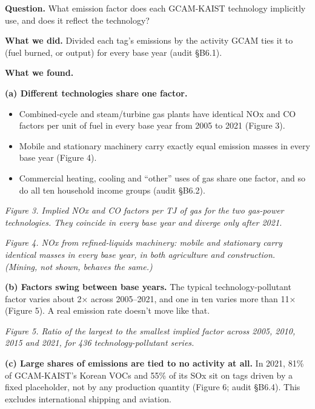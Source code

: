 \textbf{Question.}
What
emission
factor
does each
GCAM-KAIST
technology
implicitly
use, and
does it
reflect
the
technology?

\textbf{What
we did.}
Divided
each tag's
emissions
by the
activity
GCAM ties
it to
(fuel
burned, or
output)
for every
base year
(audit
§B6.1).

\textbf{What
we found.}

\textbf{(a)
Different
technologies
share one
factor.}

\begin{itemize}
\tightlist
\item
  Combined-cycle
  and
  steam/turbine
  gas
  plants
  have
  identical
  NOx and
  CO
  factors
  per unit
  of fuel
  in every
  base
  year
  from
  2005 to
  2021
  (Figure
  3).
\item
  Mobile
  and
  stationary
  machinery
  carry
  exactly
  equal
  emission
  masses
  in every
  base
  year
  (Figure
  4).
\item
  Commercial
  heating,
  cooling
  and
  ``other''
  uses of
  gas
  share
  one
  factor,
  and so
  do all
  ten
  household
  income
  groups
  (audit
  §B6.2).
\end{itemize}


\emph{Figure
3. Implied
NOx and CO
factors
per TJ of
gas for
the two
gas-power
technologies.
They
coincide
in every
base year
and
diverge
only after
2021.}


\emph{Figure
4. NOx
from
refined-liquids
machinery:
mobile and
stationary
carry
identical
masses in
every base
year, in
both
agriculture
and
construction.
(Mining,
not shown,
behaves
the
same.)}

\textbf{(b)
Factors
swing
between
base
years.}
The
typical
technology-pollutant
factor
varies
about 2×
across
2005--2021,
and one in
ten varies
more than
11×
(Figure
5). A real
emission
rate
doesn't
move like
that.


\emph{Figure
5. Ratio
of the
largest to
the
smallest
implied
factor
across
2005,
2010, 2015
and 2021,
for 436
technology-pollutant
series.}

\textbf{(c)
Large
shares of
emissions
are tied
to no
activity
at all.}
In 2021,
81\% of
GCAM-KAIST's
Korean
VOCs and
55\% of
its SOx
sit on
tags
driven by
a fixed
placeholder,
not by any
production
quantity
(Figure 6;
audit
§B6.4).
This
excludes
international
shipping
and
aviation.

